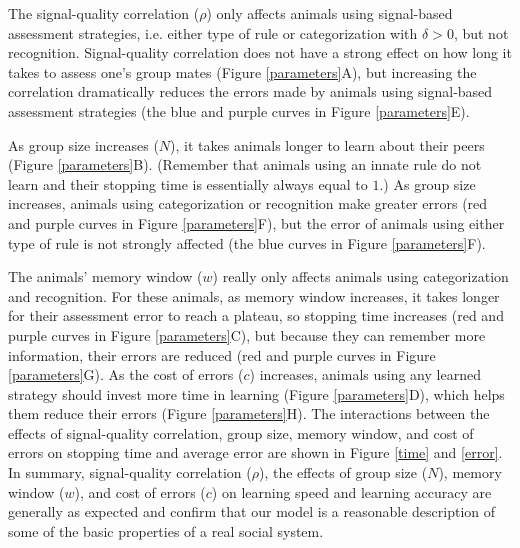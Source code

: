 The signal-quality correlation ($\rho$) only affects animals using signal-based assessment strategies, i.e. either type of rule or categorization with $\delta>0$, but not recognition. Signal-quality correlation does not have a strong effect on how long it takes to assess one's group mates (Figure \ref{parameters}A), but increasing the correlation dramatically reduces the errors made by animals using signal-based assessment strategies (the blue and purple curves in Figure \ref{parameters}E).

As group size increases ($N$), it takes animals longer to learn about their peers (Figure \ref{parameters}B). (Remember that animals using an innate rule do not learn and their stopping time is essentially always equal to $1$.) As group size increases, animals using categorization or recognition make greater errors (red and purple curves in Figure \ref{parameters}F), but the error of animals using either type of rule is not strongly affected (the blue curves in Figure \ref{parameters}F).

The animals' memory window ($w$) really only affects animals using categorization and recognition. For these animals, as memory window increases, it takes longer for their assessment error to reach a plateau, so stopping time increases (red and purple curves in Figure \ref{parameters}C), but because they can remember more information, their errors are reduced (red and purple curves in Figure \ref{parameters}G). As the cost of errors ($c$) increases, animals using any learned strategy should invest more time in learning (Figure \ref{parameters}D), which helps them reduce their errors (Figure \ref{parameters}H). The interactions between the effects of signal-quality correlation, group size, memory window, and cost of errors on stopping time and average error are shown in Figure \ref{time} and \ref{error}. In summary, signal-quality correlation ($\rho$), the effects of group size ($N$), memory window ($w$), and cost of errors ($c$) on learning speed and learning accuracy are generally as expected and confirm that our model is a reasonable description of some of the basic properties of a real social system. 
  
